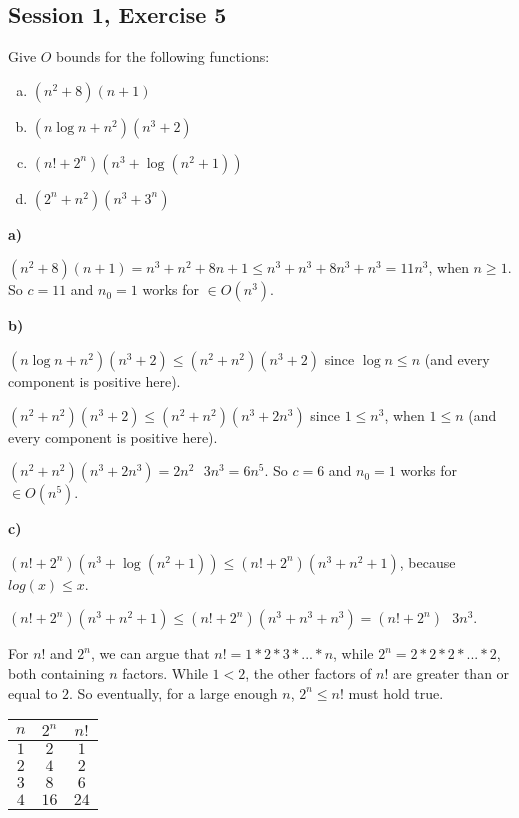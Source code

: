 \subsection{Session 1, Exercise 5}


Give $O$ bounds for the following functions:

\begin{enumerate}[a.)]
    \item $(n^2+8)(n+1)$
    \item $(n\log{n} + n^2)(n^3+2)$
    \item $(n!+2^n)(n^3+\log(n^2+1))$
    \item $(2^n+n^2)(n^3+3^n)$
\end{enumerate}


\textbf{a)}

$(n^2+8)(n+1) = n^3+n^2+8n+1 \leq{} n^3 + n^3 + 8n^3 + n^3 = 11n^3$, when $n\geq{}1$. So $c=11$ and $n_0=1$ works for $\in{}O(n^3)$.

\textbf{b)}

$(n\log{n} + n^2)(n^3+2) \leq{} (n^2 + n^2)(n^3+2)$ since $\log{n} \leq{} n$ (and every component is positive here).

$(n^2 + n^2)(n^3+2) \leq{} (n^2 + n^2)(n^3+2n^3)$ since $1 \leq{} n^3$, when $1 \leq{} n$ (and every component is positive here).

$(n^2 + n^2)(n^3+2n^3) = 2n^2\text{ }3n^3 = 6n^5$. So $c=6$ and $n_0=1$ works for $\in{}O(n^5)$.

\textbf{c)}

$(n!+2^n)(n^3+\log(n^2+1)) \leq{} (n!+2^n)(n^3+n^2+1)$, because $log(x) \leq{} x$.

$(n!+2^n)(n^3+n^2+1) \leq{} (n!+2^n)(n^3+n^3+n^3) = (n!+2^n)\text{ }3n^3$.

For $n!$ and $2^n$, we can argue that $n! = 1*2*3*...*n$, while $2^n=2*2*2*...*2$, both containing $n$ factors. While $1<2$, the other factors of $n!$ are greater than or equal to $2$. So eventually, for a large enough $n$, $2^n \leq{} n!$ must hold true.

\begin{tabular}{c|c|c}
$n$ & $2^n$ & $n!$ \\ \hline
$1$ & $2$ & $1$ \\
$2$ & $4$ & $2$ \\
$3$ & $8$ & $6$ \\
$4$ & $16$ & $24$ \\
\end{tabular}

